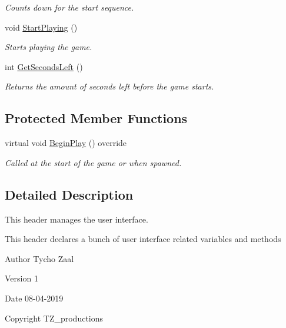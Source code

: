 \begin{DoxyCompactItemize}
\begin{DoxyCompactList}\small\item\em Counts down for the start sequence. \end{DoxyCompactList}\item 
\mbox{\label{class_a_user_interface_manager_a6a4122a2113d920c0e38588059a68839}} 
void \mbox{\hyperlink{class_a_user_interface_manager_a6a4122a2113d920c0e38588059a68839}{Start\+Playing}} ()
\begin{DoxyCompactList}\small\item\em Starts playing the game. \end{DoxyCompactList}\item 
\mbox{\label{class_a_user_interface_manager_ab66c9bb0fe8cdf1521d072d32b1db1ce}} 
int \mbox{\hyperlink{class_a_user_interface_manager_ab66c9bb0fe8cdf1521d072d32b1db1ce}{Get\+Seconds\+Left}} ()
\begin{DoxyCompactList}\small\item\em Returns the amount of seconds left before the game starts. \end{DoxyCompactList}\end{DoxyCompactItemize}
\subsection*{Protected Member Functions}
\begin{DoxyCompactItemize}
\item 
\mbox{\label{class_a_user_interface_manager_a086ad1333d930c01bb0a64e324085e56}} 
virtual void \mbox{\hyperlink{class_a_user_interface_manager_a086ad1333d930c01bb0a64e324085e56}{Begin\+Play}} () override
\begin{DoxyCompactList}\small\item\em Called at the start of the game or when spawned. \end{DoxyCompactList}\end{DoxyCompactItemize}


\subsection{Detailed Description}
This header manages the user interface. 

This header declares a bunch of user interface related variables and methods \begin{DoxyAuthor}{Author}
Tycho Zaal 
\end{DoxyAuthor}
\begin{DoxyVersion}{Version}
1 
\end{DoxyVersion}
\begin{DoxyDate}{Date}
08-\/04-\/2019 
\end{DoxyDate}
\begin{DoxyCopyright}{Copyright}
T\+Z\+\_\+productions 
\end{DoxyCopyright}


